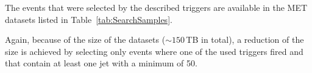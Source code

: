 The events that were selected by the described triggers are available in the MET datasets listed in Table~\ref{tab:SearchSamples}.
\renewcommand{\arraystretch}{1.5}
\begin{table}[!hbt]
\centering
\caption{MET data samples used in the search with the contained integrated luminosity.}
\label{tab:SearchSamples}
\end{table}  
Again, because of the size of the datasets ($\sim150\,$TB in total), a reduction of the size is achieved by selecting only events where one of the used triggers fired and that contain at least one jet with a minimum \pt of 50\gev.\\

